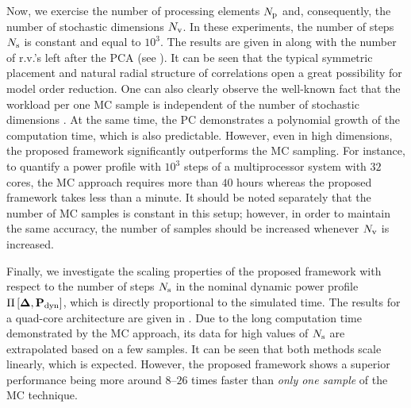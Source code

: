 
Now, we exercise the number of processing elements ${N_\text{p}}$ and, consequently, the number of stochastic dimensions ${N_\text{v}}$. In these experiments, the number of steps $N_\text{s}$ is constant and equal to $10^3$. The results are given in  along with the number of r.v.'s left after the PCA (see ). It can be seen that the typical symmetric placement and natural radial structure of correlations \cite{cheng2011} open a great possibility for model order reduction. One can also clearly observe the well-known fact that the workload per one MC sample is independent of the number of stochastic dimensions \cite{maitre2010}. At the same time, the PC demonstrates a polynomial growth \cite{heiss2008} of the computation time, which is also predictable. However, even in high dimensions, the proposed framework significantly outperforms the MC sampling. For instance, to quantify a power profile with $10^3$ steps of a multiprocessor system with $32$ cores, the MC approach requires more than $40$ hours whereas the proposed framework takes less than a minute. It should be noted separately that the number of MC samples is constant in this setup; however, in order to maintain the same accuracy, the number of samples should be increased whenever ${N_\text{v}}$ is increased.


Finally, we investigate the scaling properties of the proposed framework with respect to the number of steps $N_\text{s}$ in the nominal dynamic power profile $\prof{\mP_\dyn}$, which is directly proportional to the simulated time. The results for a quad-core architecture are given in . Due to the long computation time demonstrated by the MC approach, its data for high values of $N_\text{s}$ are extrapolated based on a few samples. It can be seen that both methods scale linearly, which is expected. However, the proposed framework shows a superior performance being more around $8$--$26$ times faster than \emph{only one sample} of the MC technique.
